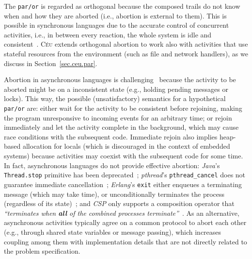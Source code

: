 \documentclass{sigplanconf}
\newcommand{\CEU}{\textsc{C\'{e}u}\xspace}
\newcommand{\code}[1] {{\small{\texttt{#1}}}}
\newcommand{\1}{\;}
\newcommand{\2}{\;\;}
\newcommand{\3}{\;\;\;}
\newcommand{\5}{\;\;\;\;\;}
\begin{document}
The \code{par/or} is regarded as orthogonal because the composed trails do not 
know when and how they are aborted (i.e., abortion is external to them).
%
This is possible in synchronous languages due to the accurate control of 
concurrent activities, i.e., in between every reaction, the whole system is 
idle and consistent~\cite{esterel.preemption}.
%
\CEU extends orthogonal abortion to work also with activities that use stateful 
resources from the environment (such as file and network handlers), as we 
discuss in Section~\ref{sec.ceu.par}.


Abortion in asynchronous languages is challenging~\cite{esterel.preemption} 
because the activity to be aborted might be on a inconsistent state (e.g., 
holding pending messages or locks).
%
This way, the possible (unsatisfactory) semantics for a hypothetical 
\code{par/or} are:
either wait for the activity to be consistent before rejoining, making the 
program unresponsive to incoming events for an arbitrary time;
or rejoin immediately and let the activity complete in the background, which 
may cause race conditions with the subsequent code.
%
Immediate rejoin also implies heap-based allocation for locals (which is 
discouraged in the context of embedded systems) because activities may coexist 
with the subsequent code for some time.
%
In fact, asynchronous languages do not provide effective abortion:
\emph{Java}'s \code{Thread.stop} primitive has been 
deprecated~\cite{sync_async.threadsstop};
\emph{pthread}'s \code{pthread\_cancel} does not guarantee immediate 
cancellation~\cite{sync_async.pthreadsstop};
\emph{Erlang}'s \code{exit} either enqueues a terminating message (which may 
take time), or unconditionally terminates the process (regardless of its 
state)~\cite{sync_async.erlangstop};
and \emph{CSP} only supports a composition operator that \emph{``terminates 
when \textbf{all} of the combined processes terminate''}~\cite{async.csp}.
%
As an alternative, asynchronous activities typically agree on a common protocol 
to abort each other (e.g., through shared state variables or message passing), 
which increases coupling among them with implementation details that are not 
directly related to the problem specification.
\end{document}
